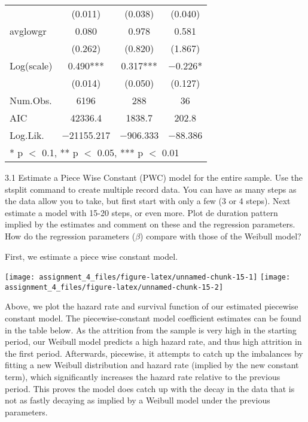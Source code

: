 \documentclass[
]{article}
\begin{document}
\begin{table}[!h]
\begin{tabular}[t]{lccc}
 & (\num{0.011}) & (\num{0.038}) & (\num{0.040})\\
avglowgr & \num{0.080} & \num{0.978} & \num{0.581}\\
 & (\num{0.262}) & (\num{0.820}) & (\num{1.867})\\
Log(scale) & \num{0.490}*** & \num{0.317}*** & \num{-0.226}*\\
 & (\num{0.014}) & (\num{0.050}) & (\num{0.127})\\
\midrule
Num.Obs. & \num{6196} & \num{288} & \num{36}\\
AIC & \num{42336.4} & \num{1838.7} & \num{202.8}\\
Log.Lik. & \num{-21155.217} & \num{-906.333} & \num{-88.386}\\
\bottomrule
\multicolumn{4}{l}{\rule{0pt}{1em}* p $<$ 0.1, ** p $<$ 0.05, *** p $<$ 0.01}\\
\end{tabular}
\end{table}

\clearpage

3.1 Estimate a Piece Wise Constant (PWC) model for the entire sample.
Use the stsplit command to create multiple record data. You can have as
many steps as the data allow you to take, but first start with only a
few (3 or 4 steps). Next estimate a model with 15-20 steps, or even
more. Plot de duration pattern implied by the estimates and comment on
these and the regression parameters. How do the regression parameters
(\(\beta\)) compare with those of the Weibull model?

First, we estimate a piece wise constant model.

\texttt{[image: assignment\_4\_files/figure-latex/unnamed-chunk-15-1]}
\texttt{[image: assignment\_4\_files/figure-latex/unnamed-chunk-15-2]}

Above, we plot the hazard rate and survival function of our estimated
piecewise constant model. The piecewise-constant model coefficient
estimates can be found in the table below. As the attrition from the
sample is very high in the starting period, our Weibull model predicts a
high hazard rate, and thus high attrition in the first period.
Afterwards, piecewise, it attempts to catch up the imbalances by fitting
a new Weibull distribution and hazard rate (implied by the new constant
term), which significantly increases the hazard rate relative to the
previous period. This proves the model does catch up with the decay in
the data that is not as fastly decaying as implied by a Weibull model
under the previous parameters.
\end{document}
